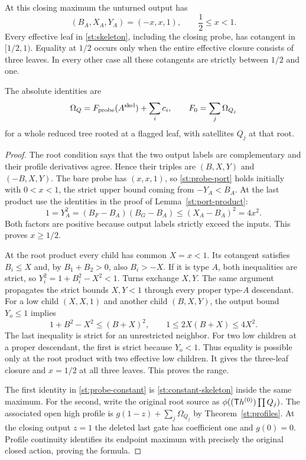 \begin{theorem}\label{st:probe}
At this closing maximum the unturned output has
\begin{equation}\label{st:probe-port}
 (B_A,X_A,Y_A)=(-x,x,1),\qquad \frac12\le x<1.
\end{equation}
Every effective leaf in \eqref{st:skeleton},
including the closing probe, has cotangent in
$[1/2,1)$. Equality at $1/2$ occurs only when
the entire effective closure consists of three
leaves. In every other case all these cotangents
are strictly between $1/2$ and one.

The absolute identities are
\begin{equation}\label{st:probe-constant}
 \Omega_Q=F_{\rm probe}(A^{\rm skel})+\sum_i c_i,
 \qquad F_0=\sum_j\Omega_{Q_j}
\end{equation}
for a whole reduced tree rooted at a flagged leaf,
with satellites $Q_j$ at that root.
\end{theorem}
\begin{proof}
The root condition says that the two output labels
are complementary and their profile derivatives
agree. Hence their triples are $(B,X,Y)$ and
$(-B,X,Y)$. The bare probe has $(x,x,1)$,
so \eqref{st:probe-port} holds initially with
$0<x<1$, the strict upper bound coming from
$-Y_A<B_A$.
At the last product use the identities in the
proof of Lemma~\ref{st:port-product}:
\[
 1=Y_A^2=(B_F-B_A)(B_G-B_A)
             \le(X_A-B_A)^2=4x^2 .
\]
Both factors are positive because output labels
strictly exceed the inputs. This proves $x\ge1/2$.

At the root product every child has common $X=x<1$.
Its cotangent satisfies $B_i\le X$ and, by
$B_1+B_2>0$, also $B_i>-X$.
If it is type $A$, both inequalities are strict,
so $Y_i^2=1+B_i^2-X^2<1$.
Turns exchange $X,Y$. The same argument propagates
the strict bounds $X,Y<1$ through every proper
type-$A$ descendant.
For a low child $(X,X,1)$ and another child
$(B,X,Y)$, the output bound $Y_o\le1$ implies
\begin{equation}\label{st:effective-bound}
 1+B^2-X^2\le(B+X)^2,\qquad
 1\le2X(B+X)\le4X^2.
\end{equation}
The last inequality is strict for an unrestricted
neighbor. For two low children at a proper
descendant, the first is strict because $Y_o<1$.
Thus equality is possible only at the root
product with two effective low children. It
gives the three-leaf closure and $x=1/2$ at
all three leaves. This proves the range.

The first identity in \eqref{st:probe-constant}
is \eqref{st:constant-skeleton} inside the same
maximum. For the second, write the original
root source as $\phi((\mathsf T h^{(0)})\prod Q_j)$.
The associated open high profile is
$g(1-z)+\sum_j\Omega_{Q_j}$ by
Theorem~\ref{st:profiles}. At the closing output
$z=1$ the deleted last gate has coefficient
one and $g(0)=0$. Profile continuity identifies
its endpoint maximum with precisely the original
closed action, proving the formula.
\end{proof}

